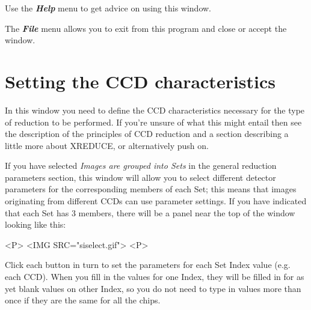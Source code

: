 \documentclass[11pt]{article}
\newcommand{\xref}[3]{#1}
\newcommand{\xlabel}[1]{}
\newcommand{\menu}[1]{{\bf \em #1}}
\begin{document}
Use the \menu{Help} menu to get advice on using this window.

The \menu{File} menu allows you to exit from this program and close or
accept the window.

\section{Setting the CCD characteristics \xlabel{CCDSetCCDGlobalsWindow}
         \label{CCDSetCCDGlobalsWindow}}

In this window you need to define the CCD characteristics necessary
for the type of reduction to be performed. If you're unsure of what
this might entail then see the description of the
\xref{principles of CCD reduction}{sun139}{CCDprinciples}
and a section describing a little more about
\xref{XREDUCE}{sun139}{usingxreduce},
or alternatively push on.

If you have selected {\em Images are grouped into Sets\/}
in the general reduction parameters section, this window will allow
you to select different detector parameters for the corresponding
members of each Set; 
this means that images originating from different CCDs 
can use parameter settings.
If you have indicated that each Set has 3 members, there will be a 
panel near the top of the window looking like this:
\begin{rawhtml}
<P>
<IMG SRC="siselect.gif">
<P>
\end{rawhtml}
Click each button in turn to set the parameters for each Set Index
value (e.g. each CCD).  When you fill in the values for one Index, 
they will be filled in for as yet blank values on other Index, so you
do not need to type in values more than once if they are the same
for all the chips.
\end{document}
